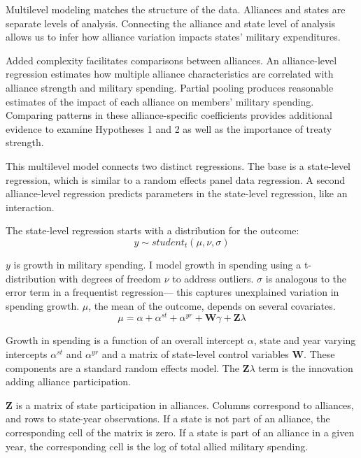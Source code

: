 \documentclass[12pt]{article}
\begin{document}
Multilevel modeling matches the structure of the data.
Alliances and states are separate levels of analysis. 
Connecting the alliance and state level of analysis allows us to infer how alliance variation impacts states' military expenditures. 


Added complexity facilitates comparisons between alliances. 
An alliance-level regression estimates how multiple alliance characteristics are correlated with alliance strength and military spending.
Partial pooling produces reasonable estimates of the impact of each alliance on members' military spending. 
Comparing patterns in these alliance-specific coefficients provides additional evidence to examine Hypotheses 1 and 2 as well as the importance of treaty strength. 


This multilevel model connects two distinct regressions. 
The base is a state-level regression, which is similar to a random effects panel data regression.
A second alliance-level regression predicts parameters in the state-level regression, like an interaction. 


The state-level regression starts with a distribution for the outcome:
\begin{equation}
y \sim student_t(\mu, \nu, \sigma)
\end{equation}
 
$y$ is growth in military spending. 
I model growth in spending using a t-distribution with degrees of freedom $\nu$ to address outliers.
$\sigma$ is analogous to the error term in a frequentist regression--- this captures unexplained variation in spending growth.  
$\mu$, the mean of the outcome, depends on several covariates.
\begin{equation}
\mu = \alpha + \alpha^{st} + \alpha^{yr} +\textbf{W} \gamma + \textbf{Z} \lambda
\end{equation}


Growth in spending is a function of an overall intercept $\alpha$, state and year varying intercepts $\alpha^{st}$ and $\alpha^{yr}$ and a matrix of state-level control variables $\textbf{W}$.
These components are a standard random effects model. 
The $\textbf{Z} \lambda$ term is the innovation adding alliance participation.


$\textbf{Z}$ is a matrix of state participation in alliances. 
Columns correspond to alliances, and rows to state-year observations. 
If a state is not part of an alliance, the corresponding cell of the matrix is zero.
If a state is part of an alliance in a given year, the corresponding cell is the log of total allied military spending. 
\end{document}
